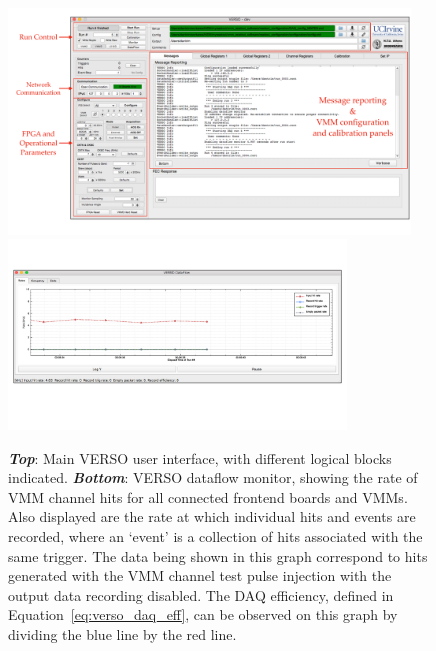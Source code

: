 \begin{figure}[!htb]
    \begin{center}
        \includegraphics[width=0.95\textwidth]{figures/nsw/vrs/verso_mainPDF}
        \includegraphics[width=0.8\textwidth]{figures/nsw/vrs/verso_dataflow}
        \caption{
            \textbf{\textit{Top}}: Main VERSO user interface, with different logical blocks indicated.
            \textbf{\textit{Bottom}}: VERSO dataflow monitor, showing the rate of VMM channel hits
                for all connected frontend boards and VMMs. Also displayed are the rate at which individual
                hits and events are recorded, where an `event' is a collection of hits associated with the
                same trigger.
                The data being shown in this graph correspond to hits generated with the VMM channel
                test pulse injection with the output data recording disabled.
                The DAQ efficiency, defined in Equation~\ref{eq:verso_daq_eff}, can be observed on this graph
                by dividing the blue line by the red line.
        }
        \label{fig:verso_main}
    \end{center}
\end{figure}

